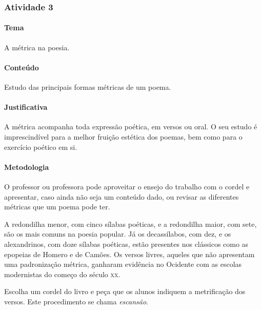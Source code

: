 \documentclass[11pt]{extarticle}
\begin{document}


\subsubsection{Atividade 3}

\paragraph{Tema} A métrica na poesia.

\paragraph{Conteúdo} Estudo das principais formas métricas de um poema.

\paragraph{Justificativa} A métrica acompanha toda expressão poética,
em versos ou oral. O seu estudo é imprescindível para a melhor fruição
estética dos poemas, bem como para o exercício poético em si.

\paragraph{Metodologia} O professor ou professora pode aproveitar o ensejo do trabalho com o cordel
e apresentar, caso ainda não seja um conteúdo dado, ou revisar as diferentes
métricas que um poema pode ter. 

A redondilha menor, com cinco sílabas poéticas, e a redondilha maior, com sete,
são os mais comuns na poesia popular. Já os decassílabos, com dez, e os alexandrinos,
com doze sílabas poéticas, estão presentes nos clássicos como as epopeias de Homero
e de Camões. Os versos livres, aqueles que não apresentam uma padronização métrica,
ganharam evidência no Ocidente com as escolas modernistas do começo do século \textsc{xx}.

Escolha um cordel do livro e peça que os alunos indiquem a metrificação dos versos. 
Este procedimento se chama \textit{escansão}.
\end{document}

